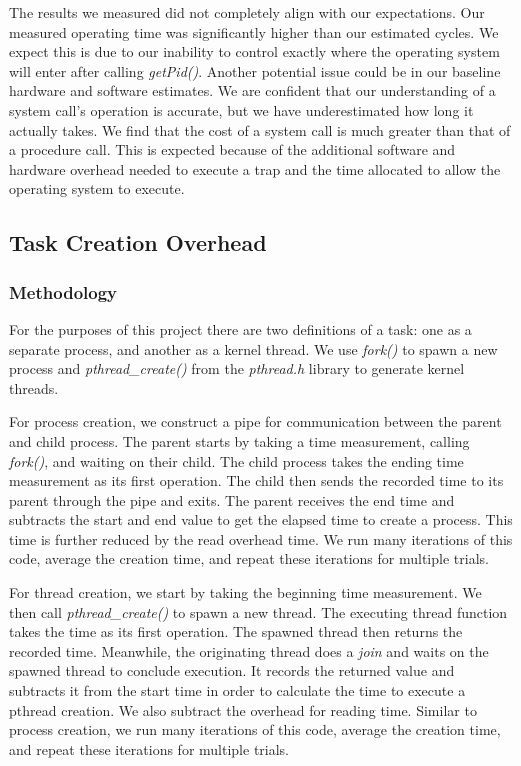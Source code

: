\documentclass[sigconf]{acmart}
\begin{document}
The results we measured did not completely align with our expectations. Our measured operating time was significantly higher than our estimated cycles. We expect this is due to our inability to control exactly where the operating system will enter after calling \textit{getPid()}. Another potential issue could be in our baseline hardware and software estimates. We are confident that our understanding of a system call's operation is accurate, but we have underestimated how long it actually takes. We find that the cost of a system call is much greater than that of a procedure call. This is expected because of the additional software and hardware overhead needed to execute a trap and the time allocated to allow the operating system to execute.

\subsection{Task Creation Overhead}
\subsubsection{Methodology}
For the purposes of this project there are two definitions of a task: one as a separate process, and another as a kernel thread. We use \textit{fork()} to spawn a new process and \textit{pthread\_create()} from the \textit{pthread.h} library to generate kernel threads.

For process creation, we construct a pipe for communication between the parent and child process. The parent starts by taking a time measurement, calling \textit{fork()}, and waiting on their child. The child process takes the ending time measurement as its first operation. The child then sends the recorded time to its parent through the pipe and exits. The parent receives the end time and subtracts the start and end value to get the elapsed time to create a process. This time is further reduced by the read overhead time. We run many iterations of this code, average the creation time, and repeat these iterations for multiple trials.

For thread creation, we start by taking the beginning time measurement. We then call \textit{pthread\_create()} to spawn a new thread. The executing thread function takes the time as its first operation. The spawned thread then returns the recorded time. Meanwhile, the originating thread does a \textit{join} and waits on the spawned thread to conclude execution. It records the returned value and subtracts it from the start time in order to calculate the time to execute a pthread creation. We also subtract the overhead for reading time. Similar to process creation, we run many iterations of this code, average the creation time, and repeat these iterations for multiple trials.
\end{document}
